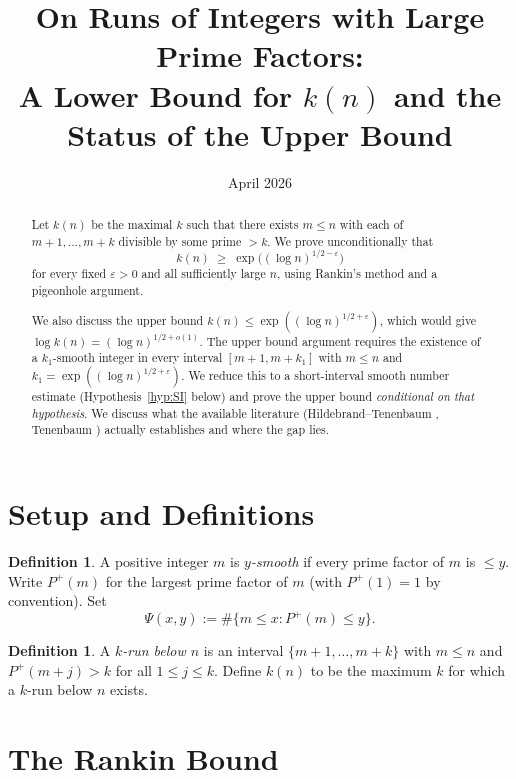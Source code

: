 \documentclass[12pt]{article}
\title{On Runs of Integers with Large Prime Factors:\\
A Lower Bound for $k(n)$ and the Status of the Upper Bound}
\author{}
\date{April 2026}
\theoremstyle{definition}
\newtheorem{definition}[theorem]{Definition}
\begin{document}
\maketitle

\begin{abstract}
Let $k(n)$ be the maximal $k$ such that there exists $m \leq n$ with each of
$m+1, \ldots, m+k$ divisible by some prime $> k$.
We prove unconditionally that
\[
  k(n) \;\geq\; \exp\!\bigl((\log n)^{1/2 - \varepsilon}\bigr)
\]
for every fixed $\varepsilon > 0$ and all sufficiently large $n$,
using Rankin's method and a pigeonhole argument.

We also discuss the upper bound $k(n) \leq \exp((\log n)^{1/2+\varepsilon})$,
which would give $\log k(n) = (\log n)^{1/2+o(1)}$.
The upper bound argument requires the existence of a $k_1$-smooth integer
in every interval $[m+1, m+k_1]$ with $m \leq n$ and $k_1 = \exp((\log n)^{1/2+\varepsilon})$.
We reduce this to a short-interval smooth number estimate
(Hypothesis~\ref{hyp:SI} below) and prove the upper bound
\emph{conditional on that hypothesis}.
We discuss what the available literature (Hildebrand--Tenenbaum \cite{HT},
Tenenbaum \cite{Ten}) actually establishes and where the gap lies.
\end{abstract}

\section{Setup and Definitions}

\begin{definition}
A positive integer $m$ is \emph{$y$-smooth} if every prime factor of $m$
is $\leq y$.  Write $P^+(m)$ for the largest prime factor of $m$
(with $P^+(1) = 1$ by convention).  Set
\[
  \Psi(x, y) := \#\{m \leq x : P^+(m) \leq y\}.
\]
\end{definition}

\begin{definition}
A \emph{$k$-run below $n$} is an interval $\{m+1, \ldots, m+k\}$
with $m \leq n$ and $P^+(m+j) > k$ for all $1 \leq j \leq k$.
Define $k(n)$ to be the maximum $k$ for which a $k$-run below $n$ exists.
\end{definition}

\section{The Rankin Bound}
\end{document}
